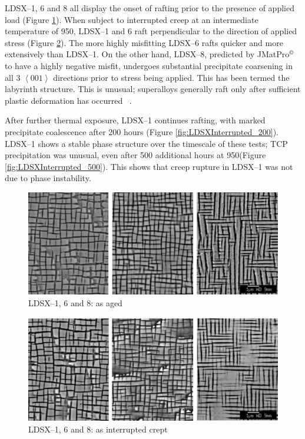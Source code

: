 LDSX--1, 6 and 8 all display the onset of rafting prior to the presence of applied load (Figure \ref{fig:LDSXAsAged}). When subject to interrupted creep at an intermediate temperature of 950\celsius, LDSX--1 and 6 raft perpendicular to the direction of applied stress (Figure \ref{fig:LDSXInterrupted}).  The more highly misfitting LDSX--6 rafts quicker and more extensively than LDSX--1.  On the other hand, LDSX--8, predicted by JMatPro$^{\copyright}$ to have a highly negative misfit, undergoes substantial precipitate coarsening in all 3 $\left<001\right>$ directions prior to stress being applied.  This has been termed the labyrinth structure.  This is unusual; superalloys generally raft only after sufficient plastic deformation has occurred ~\cite{reed99}.

After further thermal exposure, LDSX--1 continues rafting, with marked precipitate coalescence after 200 hours (Figure \ref{fig:LDSXInterrupted_200}).  LDSX--1 shows a stable phase structure over the timescale of these tests; TCP precipitation was unusual, even after 500 additional hours at 950\celsius (Figure \ref{fig:LDSXInterrupted_500}).  This shows that creep rupture in LDSX--1 was not due to phase instability.
%
\begin{figure}[hp]
\begin{center}
\includegraphics{LDSXAsAged}
\caption{LDSX--1, 6 and 8: as aged}\label{fig:LDSXAsAged}
\end{center}
\end{figure} 
%
\begin{figure}[hp]
\begin{center}
\includegraphics{LDSXInterrupted}
\caption{LDSX--1, 6 and 8: as interrupted crept }\label{fig:LDSXInterrupted}
\end{center}
\end{figure} 
